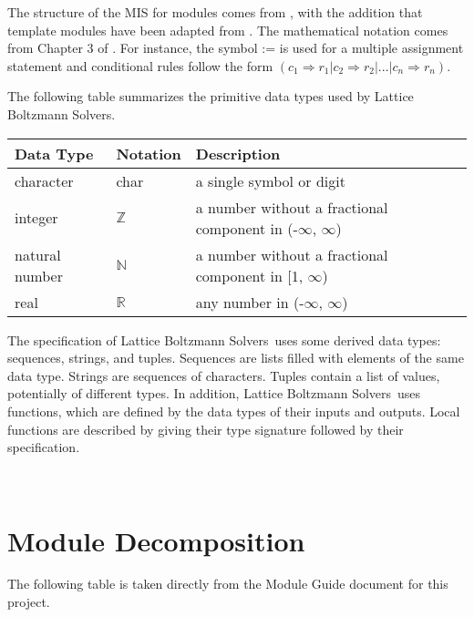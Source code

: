 \documentclass[12pt, titlepage]{article}
\newcommand{\famname}{Lattice Boltzmann Solvers}
\begin{document}

The structure of the MIS for modules comes from \citet{HoffmanAndStrooper1995},
with the addition that template modules have been adapted from
\cite{GhezziEtAl2003}.  The mathematical notation comes from Chapter 3 of
\citet{HoffmanAndStrooper1995}.  For instance, the symbol := is used for a
multiple assignment statement and conditional rules follow the form $(c_1
\Rightarrow r_1 | c_2 \Rightarrow r_2 | ... | c_n \Rightarrow r_n )$.

The following table summarizes the primitive data types used by \famname. 

\begin{center}
\renewcommand{\arraystretch}{1.2}
\noindent 
\begin{tabular}{l l p{7.5cm}} 
\toprule 
\textbf{Data Type} & \textbf{Notation} & \textbf{Description}\\ 
\midrule
character & char & a single symbol or digit\\
integer & $\mathbb{Z}$ & a number without a fractional component in (-$\infty$, $\infty$) \\
natural number & $\mathbb{N}$ & a number without a fractional component in [1, $\infty$) \\
real & $\mathbb{R}$ & any number in (-$\infty$, $\infty$)\\
\bottomrule
\end{tabular} 
\end{center}

\noindent
The specification of \famname \ uses some derived data types: sequences, strings, and
tuples. Sequences are lists filled with elements of the same data type. Strings
are sequences of characters. Tuples contain a list of values, potentially of
different types. In addition, \famname \ uses functions, which
are defined by the data types of their inputs and outputs. Local functions are
described by giving their type signature followed by their specification.

~\newpage

\section{Module Decomposition}

The following table is taken directly from the Module Guide document for this project.
\end{document}
